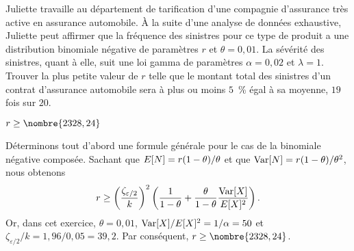 \begin{exercice}
  \label{ex:stabilite:rBNC}
  Juliette travaille au département de tarification d'une compagnie
  d'assurance très active en assurance automobile. À la suite d'une
  analyse de données exhaustive, Juliette peut affirmer que la
  fréquence des sinistres pour ce type de produit a une distribution
  binomiale négative de paramètres $r$ et $\theta = 0,01$. La sévérité
  des sinistres, quant à elle, suit une loi gamma de paramètres
  $\alpha = 0,02$ et $\lambda = 1$. Trouver la plus petite valeur de
  $r$ telle que le montant total des sinistres d'un contrat
  d'assurance automobile sera à plus ou moins $5$~\% égal à sa moyenne,
  $19$ fois sur $20$.
  \begin{rep}
    $r \geq \nombre{2328,24}$
  \end{rep}
  \begin{sol}
    Déterminons tout d'abord une formule générale pour le cas de la
    binomiale négative composée. Sachant que
    $E [ N ] = r(1 - \theta)/\theta$ et que
    $\operatorname{Var} [ N ] = r (1 - \theta)/\theta^2$, nous obtenons
    \begin{equation*}
      r \geq
      \left(
        \frac{\zeta_{\varepsilon/2}}{k}
      \right)^2
      \left(
        \frac{1}{1 - \theta} +
        \frac{\theta}{1-\theta} \frac{\operatorname{Var} [ X ]}{E [ X ]^2}
      \right).
    \end{equation*}
    Or, dans cet exercice, $\theta = 0,01$, $\operatorname{Var} [ X ]/E [ X ]^2 =
    1/\alpha = 50$ et $\zeta_{\varepsilon/2}/k = 1,96/0,05 = 39,2$. Par
    conséquent, $r \geq \nombre{2328,24}$.
  \end{sol}
\end{exercice}

